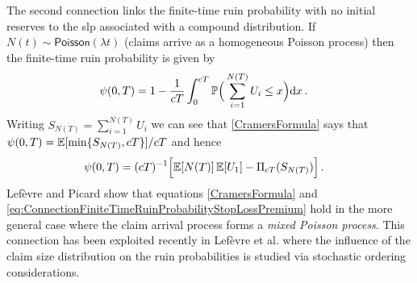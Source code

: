 The second connection links the finite-time ruin probability with no initial reserves to the slp associated with a compound distribution.
If $N(t) \sim \mathsf{Poisson}(\lambda t)$ (\ie claims arrive as a homogeneous Poisson process) then the finite-time ruin probability is given by
\begin{align} \label{CramersFormula}
\psi(0, T)
&= 1 - \frac{1}{cT} \int_0^{cT} \mathbb P \Big( \sum_{i=1}^{N(T)} U_i \le x \Big) \mathrm{d} x \,.
\end{align}
Writing $S_{N(T)} = \sum_{i=1}^{N(T)} U_i$ we can see that \eqref{CramersFormula} says that $\psi(0,T) = \mathbb E [ \min\{S_{N(T)}, cT \} ]/cT$ and hence
\begin{align} \label{eq:ConnectionFiniteTimeRuinProbabilityStopLossPremium}
\psi(0, T)
&= (cT)^{-1} \Big[  \mathbb E[N(T)] \, \mathbb E[U_1] - \Pi_{cT}(S_{N(T)}) \Big] \,.
\end{align}
Lef\`evre and Picard \cite[Corollary 4.3]{LePi11} show that equations \eqref{CramersFormula} and \eqref{eq:ConnectionFiniteTimeRuinProbabilityStopLossPremium} hold in the more general case where the claim arrival process forms a \textit{mixed Poisson process}. This connection has been exploited recently in Lef\`evre et al. \cite{LeTrZu17} where the influence of the claim size distribution on the ruin probabilities is studied via stochastic ordering considerations.
